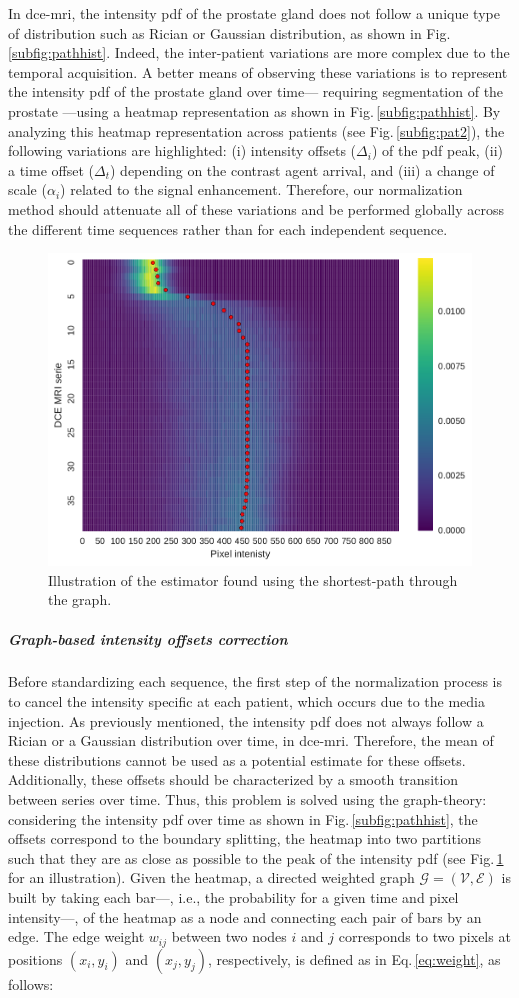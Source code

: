 \documentclass[a4paper,num-refs]{wiley-article}
\begin{document}
In \ac{dce}-\ac{mri}, the intensity \ac{pdf} of the prostate gland does not
follow a unique type of distribution such as Rician or Gaussian distribution,
as shown in Fig.\,\ref{subfig:pathhist}. Indeed, the inter-patient variations
are more complex due to the temporal acquisition. A better means of observing
these variations is to represent the intensity \ac{pdf} of the prostate gland
over time--- requiring segmentation of the prostate ---using a heatmap
representation as shown in Fig.\,\ref{subfig:pathhist}. By analyzing this
heatmap representation across patients (see Fig.\,\ref{subfig:pat2}), the
following variations are highlighted: (i) intensity offsets ($\Delta_i$) of the
\ac{pdf} peak, (ii) a time offset ($\Delta_t$) depending on the contrast agent
arrival, and (iii) a change of scale ($\alpha_i$) related to the signal
enhancement. Therefore, our normalization method should attenuate all of these
variations and be performed globally across the different time sequences rather
than for each independent sequence.

\begin{figure}
  \centering
  \includegraphics[width=0.45\linewidth]{images/DCE-normalization/estimator.pdf}
  \caption{Illustration of the estimator found using the shortest-path through
    the graph.}
  \label{fig:estimator}
\end{figure}

\subparagraph{Graph-based intensity offsets correction} Before standardizing each
sequence, the first step of the normalization process is to cancel the
intensity specific at each patient, which occurs due to the media injection. As
previously mentioned, the intensity \ac{pdf} does not always follow a Rician or
a Gaussian distribution over time, in \ac{dce}-\ac{mri}. Therefore, the mean of
these distributions cannot be used as a potential estimate for these
offsets. Additionally, these offsets should be characterized by a smooth
transition between series over time.  Thus, this problem is solved using the
graph-theory: considering the intensity \ac{pdf} over time as shown in
Fig.\,\ref{subfig:pathhist}, the offsets correspond to the boundary splitting,
the heatmap into two partitions such that they are as close as possible to the
peak of the intensity \ac{pdf} (see Fig.\,\ref{fig:estimator} for an
illustration). Given the heatmap, a directed weighted graph
$\mathcal{G}=(\mathcal{V}, \mathcal{E})$ is built by taking each bar---, i.e.,
the probability for a given time and pixel intensity---, of the heatmap as a
node and connecting each pair of bars by an edge. The edge weight $w_{ij}$
between two nodes $i$ and $j$ corresponds to two pixels at positions
$(x_i, y_i)$ and $(x_j, y_j)$, respectively, is defined as in
Eq.\,\eqref{eq:weight}, as follows:
\end{document}
